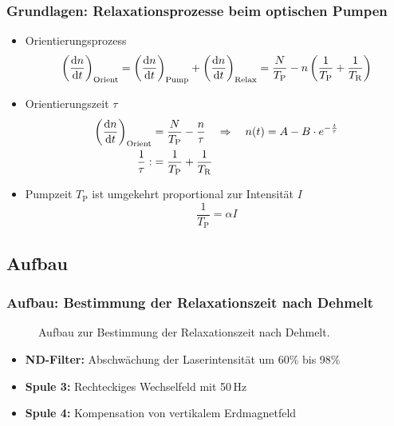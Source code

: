 \begin{frame}
\frametitle{Grundlagen: Relaxationsprozesse beim optischen Pumpen}
\begin{itemize}[<+->]
    \item Orientierungsprozess
    \begin{equation*}
        \left(\frac{\mathrm{d} n}{\mathrm{d} t}\right)_{\text{Orient}}
        =\left(\frac{\mathrm{d} n}{\mathrm{d} t}\right)_{\text{Pump}} + \left(\frac{\mathrm{d} n}{\mathrm{d} t}\right)_{\text{Relax}}
        =\frac{N}{T_\text{P}}-n \left( \frac{1}{T_\text{P}} + \frac{1}{T_\text{R}}\right)
    \end{equation*}
    \item Orientierungszeit $\tau$
    \begin{equation*}
        \begin{split}
            \left(\frac{\mathrm{d} n}{\mathrm{d} t}\right)_{\text{Orient}} &= \frac{N}{T_\text{P}}- \frac{n}{\tau} \quad \Rightarrow \quad n(t) = A - B \cdot e^{-\frac{t}{\tau}} \\
            \frac{1}{\tau} :&= \frac{1}{T_\text{P}} + \frac{1}{T_\text{R}}
        \end{split}
    \end{equation*}
    \item Pumpzeit $T_\text{P}$ ist umgekehrt proportional zur Intensität $I$
    \begin{equation*}
        \frac{1}{T_\text{P}} = \alpha I
    \end{equation*}
\end{itemize}
\end{frame}



\subsection{Aufbau}
\begin{frame}
\frametitle{Aufbau: Bestimmung der Relaxationszeit nach Dehmelt}

\begin{figure}
    \centering
    \def\svgwidth{\textwidth}
    
    \caption{Aufbau zur Bestimmung der Relaxationszeit nach Dehmelt.}
\end{figure}

\begin{itemize}
    \item \textbf{ND-Filter:} Abschwächung der Laserintensität um 60\% bis 98\%
    \item \textbf{Spule 3:} Rechteckiges Wechselfeld mit 50\,Hz
    \item \textbf{Spule 4:} Kompensation von vertikalem Erdmagnetfeld
\end{itemize}
\end{frame}

